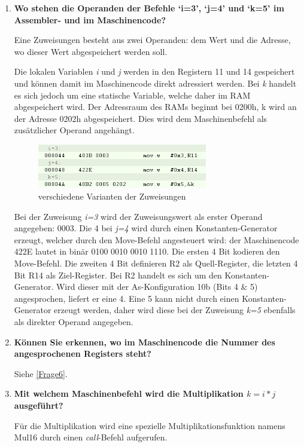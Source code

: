 \documentclass[12pt,a4paper,bibliography=totocnumbered,listof=totocnumbered]{scrartcl}
\begin{document}
\begin{enumerate}
	\item \label{Frage6}\textbf{Wo stehen die Operanden der Befehle ‘i=3’, ‘j=4’ und ‘k=5’ im Assembler- und im Maschinencode?}
	
	Eine Zuweisungen besteht aus zwei Operanden: dem Wert und die Adresse, wo dieser Wert abgespeichert werden soll.
	
	Die lokalen Variablen \textit{i} und \textit{j} werden in den Registern 11 und 14 gespeichert und können damit im Maschinencode direkt adressiert werden. Bei \textit{k} handelt es sich jedoch um eine statische Variable, welche daher im RAM abgespeichert wird. Der Adressraum des RAMs beginnt bei 0200h, k wird an der Adresse 0202h abgespeichert. Dies wird dem Maschinenbefehl als zusätzlicher Operand angehängt.
	
	\begin{figure}[!ht]
		\centering
		\includegraphics[width=0.7\textwidth]{img/Zuweisungen.png}
		\caption{verschiedene Varianten der Zuweisungen}
	\end{figure}
	
	Bei der Zuweisung \textit{i=3} wird der Zuweisungswert als erster Operand angegeben: 0003. Die 4 bei \textit{j=4} wird durch einen Konstanten-Generator erzeugt, welcher durch den Move-Befehl angesteuert wird: der Maschinencode 422E lautet in binär 0100 0010 0010 1110. Die ersten 4 Bit kodieren den Move-Befehl. Die zweiten 4 Bit definieren R2 als Quell-Register, die letzten 4 Bit R14 als Ziel-Register. Bei R2 handelt es sich um den Konstanten-Generator. Wird dieser mit der As-Konfiguration 10b (Bits 4 \& 5) angesprochen, liefert er eine 4.
	Eine 5 kann nicht durch einen Konstanten-Generator erzeugt werden, daher wird diese bei der Zuweisung \textit{k=5} ebenfalls als direkter Operand angegeben.
	
	\item \textbf{Können Sie erkennen, wo im Maschinencode die Nummer des angesprochenen Registers steht?}
	
	Siehe \ref{Frage6}.
	
	\item \textbf{Mit welchem Maschinenbefehl wird die Multiplikation \glqq\(k=i*j\)\grqq{} ausgeführt?}
	
	Für die Multiplikation wird eine spezielle Multiplikationsfunktion namens Mul16 durch einen \textit{call}-Befehl aufgerufen.
	

\end{enumerate}
\end{document}
